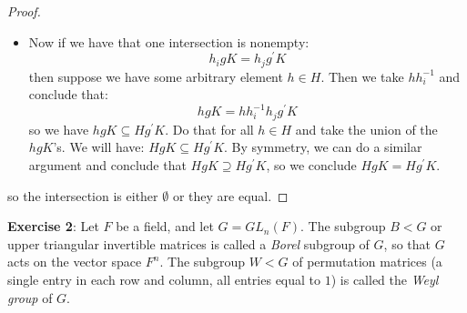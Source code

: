 \documentclass{article}
\begin{document}
\begin{itemize}
\begin{proof}
\begin{itemize}
                        \item Now if we have that one intersection is nonempty:
                            \begin{equation*}
                                h_{i}gK = h_{j}g^{\prime}K
                            \end{equation*}
                        then suppose we have some arbitrary element $h \in H$. Then we take $hh_{i}^{-1}$ and conclude that:
                            \begin{equation*}
                                hgK = hh_{i}^{-1}h_{j}g^{\prime}K
                            \end{equation*}
                        so we have $hgK \subseteq Hg^{\prime}K$. Do that for all $h \in H$ and take the union of the $hgK$'s. We will have: $HgK \subseteq Hg^{\prime}K$. By symmetry, we can do a similar argument and conclude that $HgK \supseteq Hg^{\prime}K$, so we conclude $HgK = Hg^{\prime}K$.
                    \end{itemize}
                so the intersection is either $\emptyset$ or they are equal.
            \end{proof}
    \end{itemize}

\textbf{Exercise 2}: Let $F$ be a field, and let $G = GL_{n}(F)$. The subgroup $B < G$ or upper triangular invertible matrices is called a \textit{Borel} subgroup of $G$, so that $G$ acts on the vector space $F^{n}$. The subgroup $W < G$ of permutation matrices (a single entry in each row and column, all entries equal to $1$) is called the \textit{Weyl group} of $G$.
\end{document}
